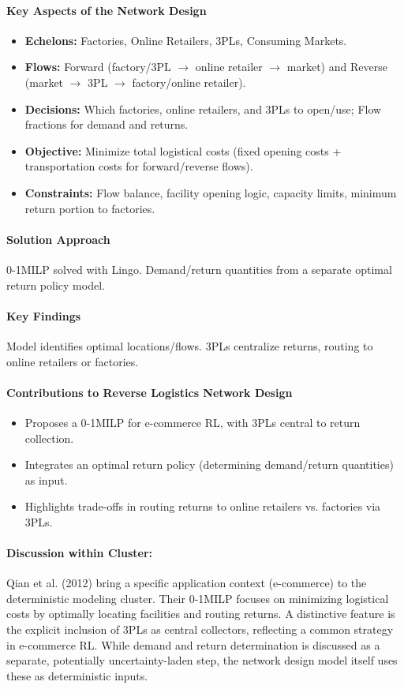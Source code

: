 \paragraph{Key Aspects of the Network Design}
\begin{itemize}
    \item \textbf{Echelons:} Factories, Online Retailers, 3PLs, Consuming Markets.
    \item \textbf{Flows:} Forward (factory/3PL $\rightarrow$ online retailer $\rightarrow$ market) and Reverse (market $\rightarrow$ 3PL $\rightarrow$ factory/online retailer).
    \item \textbf{Decisions:} Which factories, online retailers, and 3PLs to open/use; Flow fractions for demand and returns.
    \item \textbf{Objective:} Minimize total logistical costs (fixed opening costs + transportation costs for forward/reverse flows).
    \item \textbf{Constraints:} Flow balance, facility opening logic, capacity limits, minimum return portion to factories.
\end{itemize}
\paragraph{Solution Approach} 0-1MILP solved with Lingo. Demand/return quantities from a separate optimal return policy model.
\paragraph{Key Findings} Model identifies optimal locations/flows. 3PLs centralize returns, routing to online retailers or factories.
\paragraph{Contributions to Reverse Logistics Network Design}
\begin{itemize}
    \item Proposes a 0-1MILP for e-commerce RL, with 3PLs central to return collection.
    \item Integrates an optimal return policy (determining demand/return quantities) as input.
    \item Highlights trade-offs in routing returns to online retailers vs. factories via 3PLs.
\end{itemize}
\paragraph{Discussion within Cluster:} Qian et al. (2012) bring a specific application context (e-commerce) to the deterministic modeling cluster. Their 0-1MILP focuses on minimizing logistical costs by optimally locating facilities and routing returns. A distinctive feature is the explicit inclusion of 3PLs as central collectors, reflecting a common strategy in e-commerce RL. While demand and return determination is discussed as a separate, potentially uncertainty-laden step, the network design model itself uses these as deterministic inputs.

